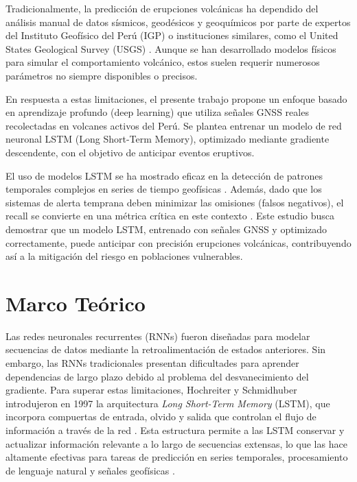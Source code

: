 \documentclass[conference]{IEEEtran}
\begin{document}
Tradicionalmente, la predicción de erupciones volcánicas ha dependido del análisis manual de datos sísmicos, geodésicos y geoquímicos por parte de expertos del Instituto Geofísico del Perú (IGP) o instituciones similares, como el United States Geological Survey (USGS) \cite{b3}. Aunque se han desarrollado modelos físicos para simular el comportamiento volcánico, estos suelen requerir numerosos parámetros no siempre disponibles o precisos.

En respuesta a estas limitaciones, el presente trabajo propone un enfoque basado en aprendizaje profundo (deep learning) que utiliza señales GNSS reales recolectadas en volcanes activos del Perú. Se plantea entrenar un modelo de red neuronal LSTM (Long Short-Term Memory), optimizado mediante gradiente descendente, con el objetivo de anticipar eventos eruptivos.

El uso de modelos LSTM se ha mostrado eficaz en la detección de patrones temporales complejos en series de tiempo geofísicas \cite{b4}. Además, dado que los sistemas de alerta temprana deben minimizar las omisiones (falsos negativos), el recall se convierte en una métrica crítica en este contexto \cite{b5}. Este estudio busca demostrar que un modelo LSTM, entrenado con señales GNSS y optimizado correctamente, puede anticipar con precisión erupciones volcánicas, contribuyendo así a la mitigación del riesgo en poblaciones vulnerables.




\section{Marco Teórico}

Las redes neuronales recurrentes (RNNs) fueron diseñadas para modelar secuencias de datos mediante la retroalimentación de estados anteriores. Sin embargo, las RNNs tradicionales presentan dificultades para aprender dependencias de largo plazo debido al problema del desvanecimiento del gradiente. Para superar estas limitaciones, Hochreiter y Schmidhuber introdujeron en 1997 la arquitectura \textit{Long Short-Term Memory} (LSTM), que incorpora compuertas de entrada, olvido y salida que controlan el flujo de información a través de la red \cite{b6}. Esta estructura permite a las LSTM conservar y actualizar información relevante a lo largo de secuencias extensas, lo que las hace altamente efectivas para tareas de predicción en series temporales, procesamiento de lenguaje natural y señales geofísicas \cite{b7}.
\end{document}
